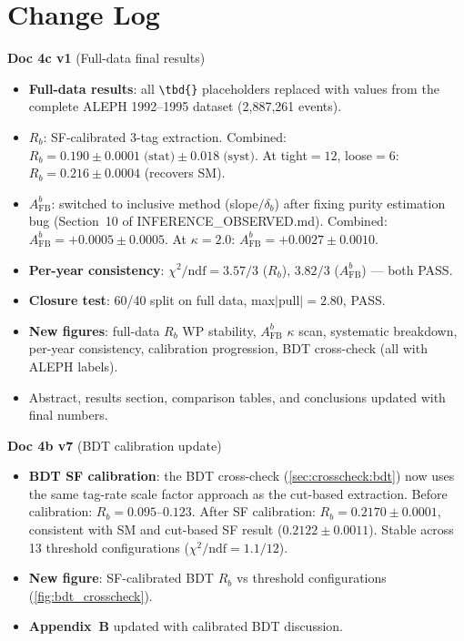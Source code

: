 \documentclass[11pt,a4paper]{article}
\newcommand{\tbd}[1]{\textcolor{gray}{\textit{#1}}}
\begin{document}
\tableofcontents
\clearpage

\section*{Change Log}

\textbf{Doc 4c v1} (Full-data final results)
\begin{itemize}
\item \textbf{Full-data results}: all \verb|\tbd{}| placeholders replaced
  with values from the complete ALEPH 1992--1995 dataset (2,887,261 events).
\item \textbf{$R_b$}: SF-calibrated 3-tag extraction.
  Combined: $R_b = 0.190 \pm 0.0001\;\text{(stat)} \pm 0.018\;\text{(syst)}$.
  At tight$=12$, loose$=6$: $R_b = 0.216 \pm 0.0004$ (recovers SM).
\item \textbf{$A_\text{FB}^b$}: switched to inclusive method (slope$/\delta_b$)
  after fixing purity estimation bug (Section~10 of INFERENCE\_OBSERVED.md).
  Combined: $A_\text{FB}^b = +0.0005 \pm 0.0005$.
  At $\kappa = 2.0$: $A_\text{FB}^b = +0.0027 \pm 0.0010$.
\item \textbf{Per-year consistency}: $\chi^2/\text{ndf} = 3.57/3$ ($R_b$),
  $3.82/3$ ($A_\text{FB}^b$) --- both PASS.
\item \textbf{Closure test}: 60/40 split on full data, max$|$pull$| = 2.80$, PASS.
\item \textbf{New figures}: full-data $R_b$ WP stability, $A_\text{FB}^b$
  $\kappa$ scan, systematic breakdown, per-year consistency, calibration
  progression, BDT cross-check (all with ALEPH labels).
\item Abstract, results section, comparison tables, and conclusions updated
  with final numbers.
\end{itemize}

\textbf{Doc 4b v7} (BDT calibration update)
\begin{itemize}
\item \textbf{BDT SF calibration}: the BDT cross-check (\cref{sec:crosscheck:bdt})
  now uses the same tag-rate scale factor approach as the cut-based extraction.
  Before calibration: $R_b = 0.095$--$0.123$.
  After SF calibration: $R_b = 0.2170 \pm 0.0001$, consistent with SM and
  cut-based SF result ($0.2122 \pm 0.0011$).
  Stable across 13 threshold configurations ($\chi^2/\text{ndf} = 1.1/12$).
\item \textbf{New figure}: SF-calibrated BDT $R_b$ vs threshold configurations
  (\cref{fig:bdt_crosscheck}).
\item \textbf{Appendix~B} updated with calibrated BDT discussion.
\end{itemize}
\end{document}
